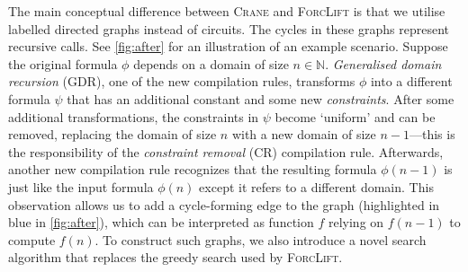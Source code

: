 
The main conceptual difference between \textsc{Crane} and \textsc{ForcLift} is
that we utilise labelled directed graphs instead of circuits. The cycles in
these graphs represent recursive calls. See \cref{fig:after} for an illustration
of an example scenario. Suppose the original formula $\phi$ depends on a domain
of size $n \in \mathbb{N}$. \emph{Generalised domain recursion} (GDR), one of
the new compilation rules, transforms $\phi$ into a different formula $\psi$
that has an additional constant and some new \emph{constraints}. After some
additional transformations, the constraints in $\psi$ become `uniform' and can
be removed, replacing the domain of size $n$ with a new domain of size
$n-1$---this is the responsibility of the \emph{constraint removal} (CR)
compilation rule. Afterwards, another new compilation rule recognizes that the
resulting formula $\phi(n-1)$ is just like the input formula $\phi(n)$ except it
refers to a different domain. This observation allows us to add a cycle-forming
edge to the graph (highlighted in blue in \cref{fig:after}), which can be
interpreted as function $f$ relying on $f(n-1)$ to compute $f(n)$. To construct
such graphs, we also introduce a novel search algorithm that replaces the greedy
search used by \textsc{ForcLift}.



